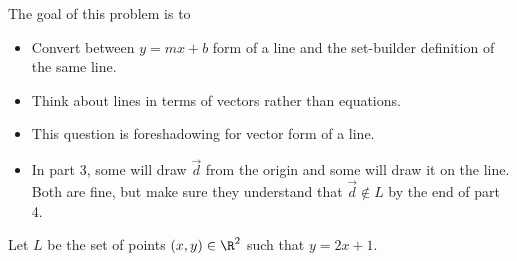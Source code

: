 	\question
	\begin{annotation}
		\begin{goals}

			The goal of this problem is to
			\begin{itemize}
				\item Convert between $y=mx+b$ form of a line and
					the set-builder definition of the same line.
				\item Think about lines in terms of vectors rather
					than equations.
			\end{itemize}
		\end{goals}

		\begin{notes}
			\begin{itemize}
				\item This question is foreshadowing for vector form of a line.
				\item In part 3, some will draw $\vec d$ from the origin and
					some will draw it on the line. Both are fine, but make
					sure they understand that $\vec d\notin L$ by the end of
					part 4.
			\end{itemize}
		\end{notes}
	\end{annotation}
	Let $L$ be the set of points $(x,y)\in\R^2$ such that $y=2x+1$.
